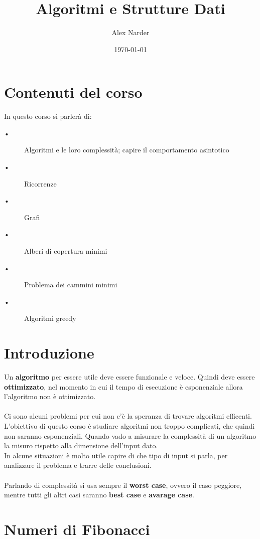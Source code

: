 \documentclass[12pt, letterpaper]{article}
\title{Algoritmi e Strutture Dati}
\author{Alex Narder}
\date{\today}
\begin{document}
\maketitle

\tableofcontents
\newpage

\section{Contenuti del corso}
In questo corso si parlerà di:
\begin{description}

	\item[•] Algoritmi e le loro complessità; capire il comportamento asintotico
	\item[•] Ricorrenze 
	\item[•] Grafi
	\item[•] Alberi di copertura minimi
	\item[•] Problema dei cammini minimi
	\item[•] Algoritmi greedy

\end{description}

\newpage

\section{Introduzione}

Un \textbf{algoritmo} per essere utile deve essere funzionale e veloce. Quindi deve essere \textbf{ottimizzato},
nel momento in cui il tempo di esecuzione è esponenziale allora l'algoritmo non è ottimizzato.
\\
\\
Ci sono alcuni problemi per cui non c'è la speranza di trovare algoritmi efficenti.
L'obiettivo di questo corso è studiare algoritmi non troppo complicati, che quindi non saranno esponenziali.
Quando vado a misurare la complessità di un algoritmo la misuro rispetto alla dimensione dell'input
dato.
\\
In alcune situazioni è molto utile capire di che tipo di input si parla, per analizzare il problema e trarre delle conclusioni.
\\
\\
Parlando di complessità si usa sempre il \textbf{worst case}, ovvero il caso peggiore, mentre tutti gli altri casi saranno
\textbf{best case} e \textbf{avarage case}.

\section{Numeri di Fibonacci}
\end{document}
